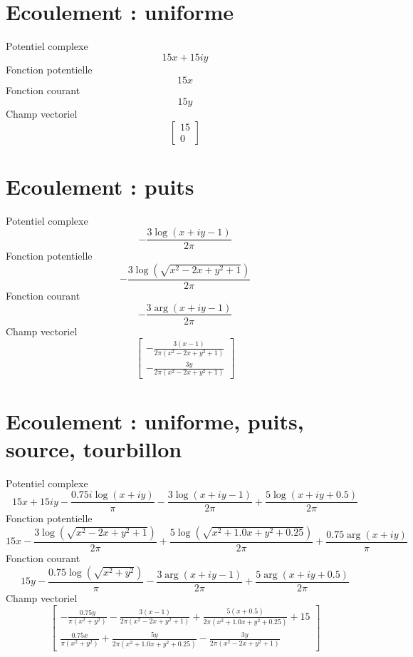 \documentclass{article}
\begin{document}
\section*{Ecoulement : uniforme}
Potentiel complexe \[15 x + 15 i y\]
Fonction potentielle \[15 x\]
Fonction courant \[15 y\]
Champ vectoriel \[\left[\begin{matrix}15\\0\end{matrix}\right]\]
\section*{Ecoulement : puits}
Potentiel complexe \[- \frac{3 \log{\left(x + i y - 1 \right)}}{2 \pi}\]
Fonction potentielle \[- \frac{3 \log{\left(\sqrt{x^{2} - 2 x + y^{2} + 1} \right)}}{2 \pi}\]
Fonction courant \[- \frac{3 \arg{\left(x + i y - 1 \right)}}{2 \pi}\]
Champ vectoriel \[\left[\begin{matrix}- \frac{3 \left(x - 1\right)}{2 \pi \left(x^{2} - 2 x + y^{2} + 1\right)}\\- \frac{3 y}{2 \pi \left(x^{2} - 2 x + y^{2} + 1\right)}\end{matrix}\right]\]
\section*{Ecoulement : uniforme, puits, source, tourbillon}
Potentiel complexe \[15 x + 15 i y - \frac{0.75 i \log{\left(x + i y \right)}}{\pi} - \frac{3 \log{\left(x + i y - 1 \right)}}{2 \pi} + \frac{5 \log{\left(x + i y + 0.5 \right)}}{2 \pi}\]
Fonction potentielle \[15 x - \frac{3 \log{\left(\sqrt{x^{2} - 2 x + y^{2} + 1} \right)}}{2 \pi} + \frac{5 \log{\left(\sqrt{x^{2} + 1.0 x + y^{2} + 0.25} \right)}}{2 \pi} + \frac{0.75 \arg{\left(x + i y \right)}}{\pi}\]
Fonction courant \[15 y - \frac{0.75 \log{\left(\sqrt{x^{2} + y^{2}} \right)}}{\pi} - \frac{3 \arg{\left(x + i y - 1 \right)}}{2 \pi} + \frac{5 \arg{\left(x + i y + 0.5 \right)}}{2 \pi}\]
Champ vectoriel \[\left[\begin{matrix}- \frac{0.75 y}{\pi \left(x^{2} + y^{2}\right)} - \frac{3 \left(x - 1\right)}{2 \pi \left(x^{2} - 2 x + y^{2} + 1\right)} + \frac{5 \left(x + 0.5\right)}{2 \pi \left(x^{2} + 1.0 x + y^{2} + 0.25\right)} + 15\\\frac{0.75 x}{\pi \left(x^{2} + y^{2}\right)} + \frac{5 y}{2 \pi \left(x^{2} + 1.0 x + y^{2} + 0.25\right)} - \frac{3 y}{2 \pi \left(x^{2} - 2 x + y^{2} + 1\right)}\end{matrix}\right]\]
\end{document}
